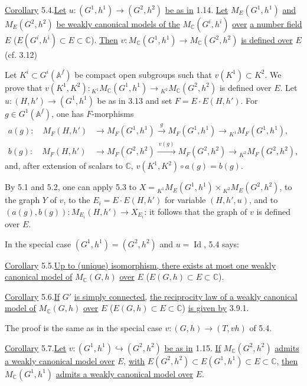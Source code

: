 \documentclass[10pt]{article}
\newcommand{\Af}{\mathbb A^f}
\newcommand{\C}{\mathbb C}
\newcommand{\MC}{M_{\C}}
\newcommand{\Id}{\operatorname{Id}}
\begin{document}
\noindent \uline{Corollary} 5.4.\quad \uline{Let} $u:(G^1,h^1)\longrightarrow(G^2,h^2)$ \uline{be as in} 1.14. \uline{Let} $M_E(G^1,h^1)$ \uline{and} $M_E(G^2,h^2)$ \uline{be weakly canonical models of the} $\MC(G^i,h^i)$ \uline{over} \uline{a number field} $E$ ($E(G^i,h^i)\subset E\subset\C$). \uline{Then} $v:\MC(G^1,h^1)\longrightarrow\MC(G^2,h^2)$ \uline{is defined over} $E$ (cf. 3.12)

Let $K^i\subset G^i(\Af)$ be compact open subgroups such that $v(K^1)\subset K^2$. We prove that $v(K^1,K^2):{}_{K^1}\MC(G^1,h^1)\longrightarrow{}_{K^2}\MC(G^2,h^2)$ is defined over $E$. Let $u:(H,h')\to(G^1,h^1)$ be as in 3.13 and set $F=E\cdot E(H,h')$. For $g\in G^1(\Af)$, one has $F$-morphisms
\[
\begin{aligned}
a(g):\quad M_F(H,h')&\longrightarrow M_F(G^1,h^1)
 \xrightarrow{\ g\ } M_F(G^1,h^1)
 \longrightarrow {}_{K^1}M_F(G^1,h^1),\\
b(g):\quad M_F(H,h')&\longrightarrow M_F(G^2,h^2)
 \xrightarrow{\ v(g)\ } M_F(G^2,h^2)
 \longrightarrow {}_{K^2}M_F(G^2,h^2),
\end{aligned}
\]
and, after extension of scalars to $\C$, $v(K^1,K^2)\circ a(g)=b(g)$.

By 5.1 and 5.2, one can apply 5.3 to $X={}_{K^1}M_E(G^1,h^1)\times{}_{K^2}M_E(G^2,h^2)$, to the graph $Y$ of $v$, to the $E_i=E\cdot E(H,h')$ for variable $(H,h',u)$, and to $(a(g),b(g)):M_{E_i}(H,h')\longrightarrow X_{E_i}$: it follows that the graph of $v$ is defined over $E$.

In the special case $(G^1,h^1)=(G^2,h^2)$ and $u=\Id$, 5.4 says:

\noindent \uline{Corollary} 5.5.\quad \uline{Up to (unique) isomorphism, there exists at most one weakly canonical model of} $\MC(G,h)$ \uline{over} $E$ ($E(G,h)\subset E\subset\C$).

\noindent \uline{Corollary} 5.6.\quad \uline{If} $G'$ \uline{is simply connected,} \uline{the reciprocity law of a weakly canonical model of} $\MC(G,h)$ \uline{over} $E$ ($E(G,h)\subset E\subset\C$) \uline{is given by} 3.9.1.

The proof is the same as in the special case $v:(G,h)\to(T,vh)$ of 5.4.

\noindent \uline{Corollary} 5.7.\quad \uline{Let} $v:(G^1,h^1)\hookrightarrow(G^2,h^2)$ \uline{be as in} 1.15. \uline{If} $\MC(G^2,h^2)$ \uline{admits a weakly canonical model over} $E$, \uline{with} $E(G^2,h^2)\subset E(G^1,h^1)\subset E\subset\C$, \uline{then} $\MC(G^1,h^1)$ \uline{admits a weakly canonical model over} $E$.
\end{document}
